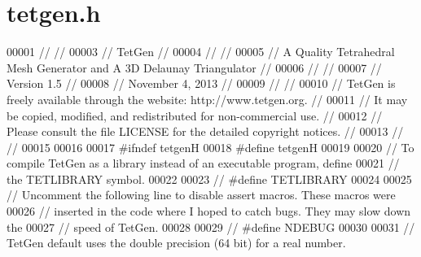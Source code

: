 \hypertarget{tetgen_8h_source}{}\section{tetgen.\+h}
\label{tetgen_8h_source}

\begin{DoxyCode}
00001 \textcolor{comment}{//                                                                           //}
00003 \textcolor{comment}{// TetGen                                                                    //}
00004 \textcolor{comment}{//                                                                           //}
00005 \textcolor{comment}{// A Quality Tetrahedral Mesh Generator and A 3D Delaunay Triangulator       //}
00006 \textcolor{comment}{//                                                                           //}
00007 \textcolor{comment}{// Version 1.5                                                               //}
00008 \textcolor{comment}{// November 4, 2013                                                          //}
00009 \textcolor{comment}{//                                                                           //}
00010 \textcolor{comment}{// TetGen is freely available through the website: http://www.tetgen.org.    //}
00011 \textcolor{comment}{//   It may be copied, modified, and redistributed for non-commercial use.   //}
00012 \textcolor{comment}{//   Please consult the file LICENSE for the detailed copyright notices.     //}
00013 \textcolor{comment}{//                                                                           //}
00015 \textcolor{comment}{}
00016 
00017 \textcolor{preprocessor}{#ifndef tetgenH}
00018 \textcolor{preprocessor}{#define tetgenH}
00019 
00020 \textcolor{comment}{// To compile TetGen as a library instead of an executable program, define}
00021 \textcolor{comment}{//   the TETLIBRARY symbol.}
00022 
00023 \textcolor{comment}{// #define TETLIBRARY}
00024 
00025 \textcolor{comment}{// Uncomment the following line to disable assert macros. These macros were}
00026 \textcolor{comment}{//   inserted in the code where I hoped to catch bugs. They may slow down the}
00027 \textcolor{comment}{//   speed of TetGen.}
00028 
00029 \textcolor{comment}{// #define NDEBUG}
00030 
00031 \textcolor{comment}{// TetGen default uses the double precision (64 bit) for a real number. }

\end{DoxyCode}
